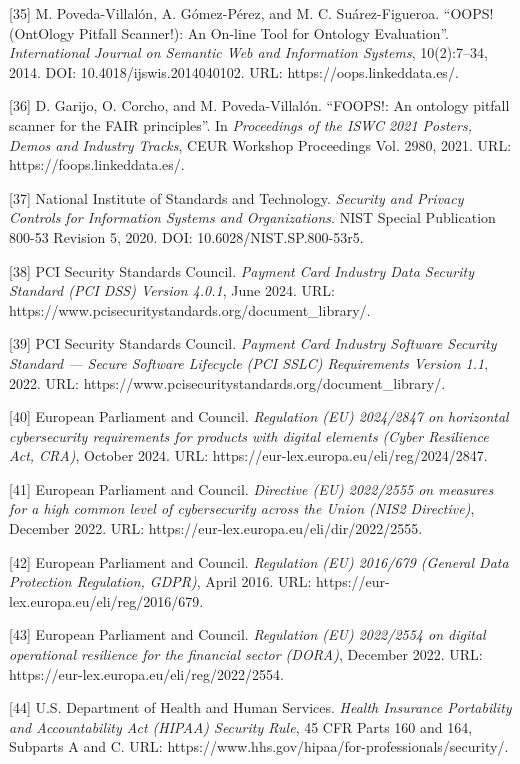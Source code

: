 \documentclass[
]{article}
\begin{document}
{[}35{]} M. Poveda-Villalón, A. Gómez-Pérez, and M. C. Suárez-Figueroa.
``OOPS! (OntOlogy Pitfall Scanner!): An On-line Tool for Ontology
Evaluation''. \emph{International Journal on Semantic Web and
Information Systems}, 10(2):7--34, 2014. DOI: 10.4018/ijswis.2014040102.
URL: https://oops.linkeddata.es/.

{[}36{]} D. Garijo, O. Corcho, and M. Poveda-Villalón. ``FOOPS!: An
ontology pitfall scanner for the FAIR principles''. In \emph{Proceedings
of the ISWC 2021 Posters, Demos and Industry Tracks}, CEUR Workshop
Proceedings Vol. 2980, 2021. URL: https://foops.linkeddata.es/.

{[}37{]} National Institute of Standards and Technology. \emph{Security
and Privacy Controls for Information Systems and Organizations}. NIST
Special Publication 800-53 Revision 5, 2020. DOI:
10.6028/NIST.SP.800-53r5.

{[}38{]} PCI Security Standards Council. \emph{Payment Card Industry
Data Security Standard (PCI DSS) Version 4.0.1}, June 2024. URL:
https://www.pcisecuritystandards.org/document\_library/.

{[}39{]} PCI Security Standards Council. \emph{Payment Card Industry
Software Security Standard --- Secure Software Lifecycle (PCI SSLC)
Requirements Version 1.1}, 2022. URL:
https://www.pcisecuritystandards.org/document\_library/.

{[}40{]} European Parliament and Council. \emph{Regulation (EU)
2024/2847 on horizontal cybersecurity requirements for products with
digital elements (Cyber Resilience Act, CRA)}, October 2024. URL:
https://eur-lex.europa.eu/eli/reg/2024/2847.

{[}41{]} European Parliament and Council. \emph{Directive (EU) 2022/2555
on measures for a high common level of cybersecurity across the Union
(NIS2 Directive)}, December 2022. URL:
https://eur-lex.europa.eu/eli/dir/2022/2555.

{[}42{]} European Parliament and Council. \emph{Regulation (EU) 2016/679
(General Data Protection Regulation, GDPR)}, April 2016. URL:
https://eur-lex.europa.eu/eli/reg/2016/679.

{[}43{]} European Parliament and Council. \emph{Regulation (EU)
2022/2554 on digital operational resilience for the financial sector
(DORA)}, December 2022. URL:
https://eur-lex.europa.eu/eli/reg/2022/2554.

{[}44{]} U.S. Department of Health and Human Services. \emph{Health
Insurance Portability and Accountability Act (HIPAA) Security Rule}, 45
CFR Parts 160 and 164, Subparts A and C. URL:
https://www.hhs.gov/hipaa/for-professionals/security/.
\end{document}
